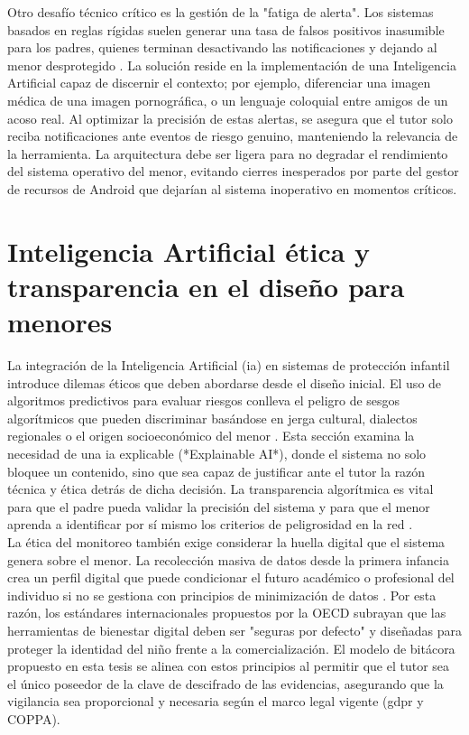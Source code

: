 Otro desafío técnico crítico es la gestión de la "fatiga de alerta". Los sistemas basados en reglas rígidas suelen generar una tasa de falsos positivos inasumible para los padres, quienes terminan desactivando las notificaciones y dejando al menor desprotegido \cite{rojas_technical_2025}. La solución reside en la implementación de una Inteligencia Artificial capaz de discernir el contexto; por ejemplo, diferenciar una imagen médica de una imagen pornográfica, o un lenguaje coloquial entre amigos de un acoso real. Al optimizar la precisión de estas alertas, se asegura que el tutor solo reciba notificaciones ante eventos de riesgo genuino, manteniendo la relevancia de la herramienta. La arquitectura debe ser ligera para no degradar el rendimiento del sistema operativo del menor, evitando cierres inesperados por parte del gestor de recursos de Android que dejarían al sistema inoperativo en momentos críticos.


\section{Inteligencia Artificial ética y transparencia en el diseño para menores}

La integración de la Inteligencia Artificial (\gls{ia}) en sistemas de protección infantil introduce dilemas éticos que deben abordarse desde el diseño inicial. El uso de algoritmos predictivos para evaluar riesgos conlleva el peligro de sesgos algorítmicos que pueden discriminar basándose en jerga cultural, dialectos regionales o el origen socioeconómico del menor \cite{agbana_ethical_2025}. Esta sección examina la necesidad de una \gls{ia} explicable (*Explainable AI*), donde el sistema no solo bloquee un contenido, sino que sea capaz de justificar ante el tutor la razón técnica y ética detrás de dicha decisión. La transparencia algorítmica es vital para que el padre pueda validar la precisión del sistema y para que el menor aprenda a identificar por sí mismo los criterios de peligrosidad en la red \cite{balapour_mobile_2020}.\\

La ética del monitoreo también exige considerar la huella digital que el sistema genera sobre el menor. La recolección masiva de datos desde la primera infancia crea un perfil digital que puede condicionar el futuro académico o profesional del individuo si no se gestiona con principios de minimización de datos \cite{swider-cios_young_2023}. Por esta razón, los estándares internacionales propuestos por la OECD \cite{noauthor_full_2025} subrayan que las herramientas de bienestar digital deben ser "seguras por defecto" y diseñadas para proteger la identidad del niño frente a la comercialización. El modelo de bitácora propuesto en esta tesis se alinea con estos principios al permitir que el tutor sea el único poseedor de la clave de descifrado de las evidencias, asegurando que la vigilancia sea proporcional y necesaria según el marco legal vigente (\gls{gdpr} y COPPA).\\

